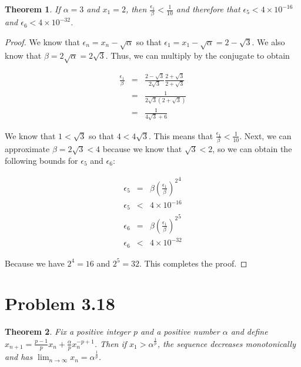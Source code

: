 \documentclass[psamsfonts]{amsart}
\newtheorem{thm}{Theorem}[section]
\theoremstyle{definition}
\theoremstyle{remark}
\numberwithin{equation}{section}
\begin{document}
\begin{thm}
If $\alpha = 3$ and $x_1 = 2$, then $\frac{\epsilon_1}{\beta} < \frac{1}{10}$ and therefore that $\epsilon_5 < 4 \times 10^{-16}$ and $\epsilon_6 < 4 \times 10^{-32}$. 
\end{thm}

\begin{proof}
We know that $\epsilon_n = x_n - \sqrt{\alpha}$ so that $\epsilon_1 = x_1 - \sqrt{\alpha} = 2 - \sqrt{3}$. We also know that $\beta = 2 \sqrt{\alpha} = 2 \sqrt{3}$. Thus, we can multiply by the conjugate to obtain

\begin{eqnarray}
\frac{\epsilon_1}{\beta} &=& \frac{2 - \sqrt{3}}{2 \sqrt{3}} \frac{2 + \sqrt{3}}{2 + \sqrt{3}} \\
&=& \frac{1}{2\sqrt{3} ( 2 + \sqrt{3})} \\
&=& \frac{1}{4 \sqrt{3} + 6} 
\end{eqnarray}

We know that $1 < \sqrt{3}$ so that $4 < 4 \sqrt{3}$. This means that $\frac{\epsilon_1}{\beta} < \frac{1}{10}$. Next, we can approximate $\beta = 2 \sqrt{3} < 4 $ because we know that $\sqrt{3} < 2$, so we can obtain the following bounds for $\epsilon_5$ and $\epsilon_6$:

\begin{eqnarray}
\epsilon_5 &=& \beta {\left(\frac{\epsilon_1}{\beta} \right)^2}^4 \\ 
\epsilon_5&<& 4 \times 10^{-16} \\
\epsilon_6 &=& \beta {\left( \frac{\epsilon_1}{\beta} \right)^2}^5 \\
\epsilon_6 &<& 4 \times 10^{-32}
\end{eqnarray}

Because we have $2^4 = 16$ and $2^5 = 32$. This completes the proof.
\end{proof}

\section{Problem 3.18}

\begin{thm}
Fix a positive integer $p$ and a positive number $\alpha$ and define $x_{n+1} = \frac{p-1}{p} x_n + \frac{\alpha}{p} x_n^{-p + 1}$. Then if $x_1 > \alpha^{\frac{1}{p}}$, the sequence decreases monotonically and has $\lim_{n \to \infty} x_n = \alpha^{\frac{1}{p}}$.
\end{thm}
\end{document}
